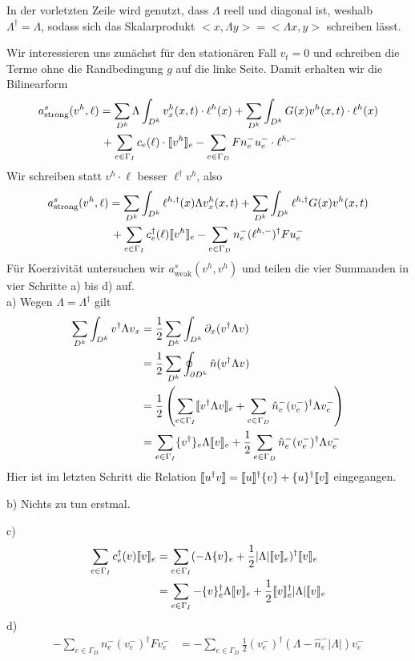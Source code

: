 In der vorletzten Zeile wird genutzt, dass $\Lambda$ reell und diagonal ist, weshalb $\Lambda^\dagger = \Lambda$, sodass sich das Skalarprodukt ${<x,\Lambda y> = <\Lambda x, y>}$ schreiben lässt.

Wir interessieren uns zunächst für den stationären Fall $v_t = 0$ und schreiben die Terme ohne die Randbedingung $g$ auf die linke Seite. Damit erhalten wir die Bilinearform
\begin{align}
  a_\text{strong}^s(v^h, \ell) &=  \sum_{D^k} \Lambda \int_{D^k} v^h_x(x,t) \cdot \ell^h(x) + \sum_{D^k} \int_{D^k} G(x) v^h(x,t) \cdot \ell^h(x) \\
  & \, + \sum_{e\in\Gamma_I}  c_e(\ell) \cdot \llbracket v^h \rrbracket_e - \sum_{e\in\Gamma_D}  F n_e^- u_e^- \cdot \ell^{h,-}
\end{align}
Wir schreiben statt $v^h\cdot \ell$ besser $\ell^{\dagger} v^h$, also
\begin{align}
  a_\text{strong}^s(v^h, \ell) &=  \sum_{D^k}  \int_{D^k} \ell^{h,\dagger}(x) \Lambda v^h_x(x,t)  + \sum_{D^k} \int_{D^k} \ell^{h,\dagger} G(x) v^h(x,t)  \\
  & \, + \sum_{e\in\Gamma_I}  c_e^{\dagger}(\ell) \llbracket v^h \rrbracket_e - \sum_{e\in\Gamma_D}  n_e^- (\ell^{h,-})^{\dagger} F u_e^-
\end{align}
Für Koerzivität untersuchen wir $a_\text{weak}^s(v^h, v^h)$ und teilen die vier Summanden in vier Schritte a) bis d) auf.\\
a) Wegen $\Lambda=\Lambda^{\dagger}$ gilt
\begin{align*}
  \sum_{D^k}\int_{D^k} v^{\dagger} \Lambda v_x
   &=  \frac{1}{2}  \sum_{D^k}\int_{D^k} \partial_x (v^{\dagger} \Lambda v) \\
   &=  \frac{1}{2}  \sum_{D^k}\oint_{\partial D^k} \hat{n} (v^{\dagger} \Lambda v) \\
   &=  \frac{1}{2}  \left( \sum_{e\in\Gamma_I} \llbracket v^{\dagger}\Lambda v \rrbracket_e
     + \sum_{e\in\Gamma_D} \hat{n}_e^-  (v^-_e)^{\dagger}\Lambda v^-_e \right) \\
   &=   \sum_{e\in\Gamma_I} \{ v^{\dagger} \}_e\Lambda\llbracket v \rrbracket_e
     + \frac{1}{2}   \sum_{e\in\Gamma_D} \hat{n}_e^-  (v^-_e)^{\dagger}\Lambda v^-_e
\end{align*}
Hier ist im letzten Schritt die Relation $\llbracket u^{\dagger}v \rrbracket = \llbracket u \rrbracket^{\dagger}\{ v \} + \{ u \}^{\dagger}\llbracket v \rrbracket$ eingegangen.

b) Nichts zu tun erstmal.

c)
\begin{align*}
  \sum_{e\in\Gamma_I}  c_e^{\dagger}(v) \llbracket v \rrbracket_e &= \sum_{e\in\Gamma_I} (-\Lambda  \{ v \}_e  + \frac{1}{2}|\Lambda| \llbracket v \rrbracket_e)^{\dagger} \llbracket v \rrbracket_e \\
  &= \sum_{e\in\Gamma_I} -\{ v \}_e^{\dagger} \Lambda \llbracket v \rrbracket_e + \frac{1}{2}\llbracket v \rrbracket_e^{\dagger} |\Lambda|\llbracket v \rrbracket_e
\end{align*}
d)
\begin{align*}
  - \sum_{e\in\Gamma_D}  n_e^- (v_e^-)^{\dagger} F v_e^- &= - \sum_{e\in\Gamma_D} \frac{1}{2}(v_e^-)^{\dagger}(\Lambda - \hat{n}_e^- |\Lambda|)v_e^-
\end{align*}

